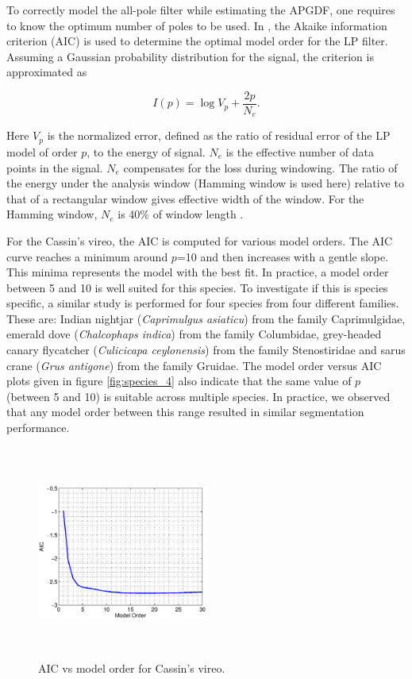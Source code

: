 \documentclass[a4paper]{article}
\begin{document}
To correctly model the all-pole filter while estimating the APGDF, one requires
to know the optimum number of poles to be used. In \cite{makhoul}, the Akaike
information criterion (AIC) is used to determine the optimal model order for the
LP filter. Assuming a Gaussian probability distribution for the signal, the
criterion is approximated as

\begin{equation}
I(p)=\log V_p+\frac{2p}{N_e}. 
\end{equation}

Here $V_p$ is the normalized error, defined as the ratio of residual error of the
LP model of order $p$, to the energy of signal. $N_e$ is the effective number of data points
in the signal.  $N_e$ compensates for the loss during windowing. The ratio of
the energy under the analysis window (Hamming window is used here) relative to
that of a rectangular window gives effective width of the window. For the
Hamming window, $N_e$ is 40\% of window length \cite{makhoul}.

For the Cassin's vireo, the AIC is computed for various model orders. The AIC
curve reaches a minimum around $p$=10 and then increases with a gentle slope.
This minima represents the model with the best fit. In
practice, a model order between 5 and 10 is well suited for this species.  To
investigate if this is species specific, a similar study is performed for four
species from four different families. These are: Indian nightjar
(\textit{Caprimulgus asiaticu}) from the family Caprimulgidae, emerald dove
(\textit{Chalcophaps indica}) from the family Columbidae, grey-headed canary
flycatcher (\textit{Culicicapa ceylonensis}) from the family Stenostiridae and
sarus crane (\textit{Grus antigone}) from the family Gruidae.  The model order
versus AIC plots given in figure \ref{fig:species_4} also indicate that the same
value of $p$ (between 5 and 10) is suitable across multiple species. In
practice, we observed that any model order between this range resulted in
similar segmentation performance.

 \begin{figure}[!ht]
	\centering
	\includegraphics[width=0.5\textwidth,height=7cm] {cassins_AIC.eps}
	\caption{AIC vs model order for Cassin's vireo.}   
	\label{fig:AIC_cassins}
\end{figure} 
\end{document}
